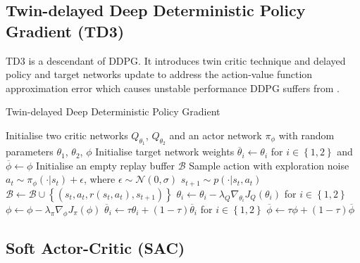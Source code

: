 {\subsection{Twin-delayed Deep Deterministic Policy Gradient (TD3)}

TD3 is a descendant of DDPG. It introduces twin critic technique and delayed policy and target networks update to address the action-value function approximation error which causes unstable performance DDPG suffers from \cite{ref:td3}.

\begin{algorithm}
\caption{Twin-delayed Deep Deterministic Policy Gradient \cite{ref:td3}}
\label{alg:td3}
\begin{algorithmic}
\State Initialise two critic networks $Q_{\theta_1}$, $Q_{\theta_2}$ and an actor network $\pi_\phi$ with random parameters $\theta_1$, $\theta_2$, $\phi$
\State Initialise target network weights $\overline{\theta}_i \gets \theta_i$  for $i \in \left\{1,2\right\}$ and $\overline{\phi} \gets \phi$
\State Initialise an empty replay buffer $\mathcal{B}$
        \State Sample action with exploration noise $a_t \sim \pi_\phi(\cdot|s_t) + \epsilon$, where $\epsilon \sim \mathcal{N}(0,\sigma)$
        \State $s_{t+1} \sim p(\cdot|s_t,a_t)$
        \State $\mathcal{B} \gets \mathcal{B} \cup \left\{(s_t,a_t,r(s_t,a_t),s_{t+1})\right\}$
    \EndFor
        \State $\theta_i \gets \theta_i - \lambda_Q\nabla_{\theta_i}J_Q(\theta_i)$ for $i \in \left\{1,2\right\}$
            \State $\phi \gets \phi - \lambda_\pi\nabla_{\phi}J_\pi(\phi)$
            \State $\overline{\theta}_i \gets \tau\theta_i + (1-\tau)\overline{\theta}_i$ for $i \in \left\{1,2\right\}$
            \State $\overline{\phi} \gets \tau\phi + (1-\tau)\overline{\phi}$
        \EndIf
    \EndFor
\EndFor
\end{algorithmic}
\end{algorithm}

\subsection{Soft Actor-Critic (SAC)}

}
